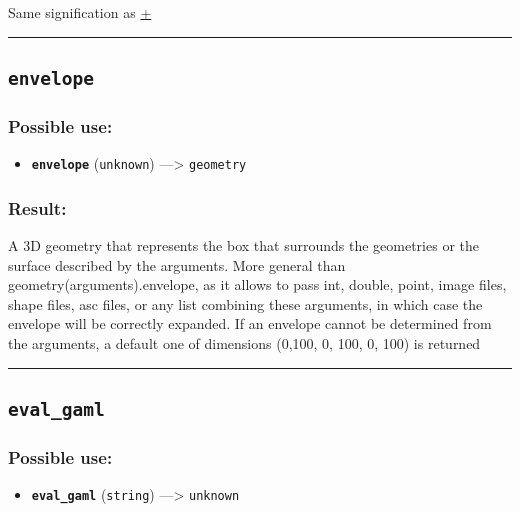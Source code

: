 \documentclass[]{book}
\providecommand{\tightlist}{%
  \setlength{\itemsep}{0pt}\setlength{\parskip}{0pt}}
\theoremstyle{definition}
\theoremstyle{definition}
\theoremstyle{definition}
\theoremstyle{remark}
\begin{document}
Same signification as \href{OperatorsAA\#+}{+}

\begin{center}\rule{0.5\linewidth}{\linethickness}\end{center}

\subsection{\texorpdfstring{\texttt{envelope}}{envelope}}\label{envelope}

\subsubsection{Possible use:}\label{possible-use-153}

\begin{itemize}
\tightlist
\item
  \textbf{\texttt{envelope}} (\texttt{unknown}) ---\textgreater{}
  \texttt{geometry}
\end{itemize}

\subsubsection{Result:}\label{result-147}

A 3D geometry that represents the box that surrounds the geometries or
the surface described by the arguments. More general than
geometry(arguments).envelope, as it allows to pass int, double, point,
image files, shape files, asc files, or any list combining these
arguments, in which case the envelope will be correctly expanded. If an
envelope cannot be determined from the arguments, a default one of
dimensions (0,100, 0, 100, 0, 100) is returned

\begin{center}\rule{0.5\linewidth}{\linethickness}\end{center}

\subsection{\texorpdfstring{\texttt{eval\_gaml}}{eval\_gaml}}\label{eval_gaml}

\subsubsection{Possible use:}\label{possible-use-154}

\begin{itemize}
\tightlist
\item
  \textbf{\texttt{eval\_gaml}} (\texttt{string}) ---\textgreater{}
  \texttt{unknown}
\end{itemize}
\end{document}
